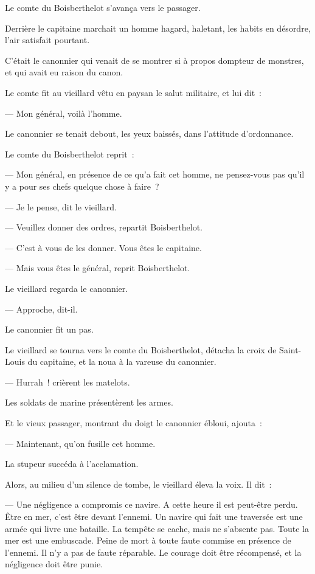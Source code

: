 \documentclass[french,twoside]{book} %
\begin{document}
Le comte du Boisberthelot s’avança vers le passager.\par
Derrière le capitaine marchait un homme hagard,  haletant, les habits en désordre, l’air satisfait pourtant.\par
C’était le canonnier qui venait de se montrer si à propos dompteur de monstres, et qui avait eu raison du canon.\par
Le comte fit au vieillard vêtu en paysan le salut militaire, et lui dit :\par
— Mon général, voilà l’homme.\par
Le canonnier se tenait debout, les yeux baissés, dans l’attitude d’ordonnance.\par
Le comte du Boisberthelot reprit :\par
— Mon général, en présence de ce qu’a fait cet homme, ne pensez-vous pas qu’il y a pour ses chefs quelque chose à faire ?\par
— Je le pense, dit le vieillard.\par
— Veuillez donner des ordres, repartit Boisberthelot.\par
— C’est à vous de les donner. Vous êtes le capitaine.\par
— Mais vous êtes le général, reprit Boisberthelot.\par
Le vieillard regarda le canonnier.\par
— Approche, dit-il.\par
Le canonnier fit un pas.\par
Le vieillard se tourna vers le comte du Boisberthelot, détacha la croix de Saint-Louis du capitaine, et la noua à la vareuse du canonnier.\par
— Hurrah ! crièrent les matelots.\par
Les soldats de marine présentèrent les armes.\par
Et le vieux passager, montrant du doigt le canonnier ébloui, ajouta :\par
— Maintenant, qu’on fusille cet homme.\par
La stupeur succéda à l’acclamation.\par
 Alors, au milieu d’un silence de tombe, le vieillard éleva la voix. Il dit :\par
— Une négligence a compromis ce navire. A cette heure il est peut-être perdu. Être en mer, c’est être devant l’ennemi. Un navire qui fait une traversée est une armée qui livre une bataille. La tempête se cache, mais ne s’absente pas. Toute la mer est une embuscade. Peine de mort à toute faute commise en présence de l’ennemi. Il n’y a pas de faute réparable. Le courage doit être récompensé, et la négligence doit être punie.\par
\end{document}
